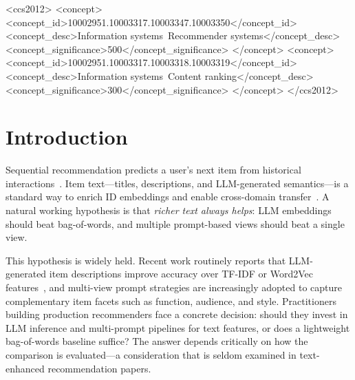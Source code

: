 \documentclass[sigconf,natbib=true,anonymous]{acmart}
\begin{document}
\begin{CCSXML}
<ccs2012>
 <concept>
  <concept_id>10002951.10003317.10003347.10003350</concept_id>
  <concept_desc>Information systems~Recommender systems</concept_desc>
  <concept_significance>500</concept_significance>
 </concept>
 <concept>
  <concept_id>10002951.10003317.10003318.10003319</concept_id>
  <concept_desc>Information systems~Content ranking</concept_desc>
  <concept_significance>300</concept_significance>
 </concept>
</ccs2012>
\end{CCSXML}


\maketitle

\section{Introduction}
\label{sec:intro}

Sequential recommendation predicts a user's next item from historical interactions~\cite{kang2018sasrec,sun2019bert4rec,hidasi2016gru4rec}.
Item text---titles, descriptions, and LLM-generated semantics---is a standard way to enrich ID embeddings and enable cross-domain transfer~\cite{hou2022unisrec,bao2023tallrec}.
A natural working hypothesis is that \emph{richer text always helps}: LLM embeddings should beat bag-of-words, and multiple prompt-based views should beat a single view.

This hypothesis is widely held.
Recent work routinely reports that LLM-generated item descriptions improve accuracy over TF-IDF or Word2Vec features~\cite{hou2022unisrec,bao2023tallrec}, and multi-view prompt strategies are increasingly adopted to capture complementary item facets such as function, audience, and style.
Practitioners building production recommenders face a concrete decision: should they invest in LLM inference and multi-prompt pipelines for text features, or does a lightweight bag-of-words baseline suffice?
The answer depends critically on how the comparison is evaluated---a consideration that is seldom examined in text-enhanced recommendation papers.
\end{document}
